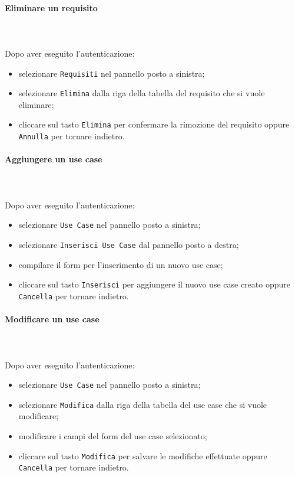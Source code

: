 	\paragraph{Eliminare un requisito} \mbox{}\\ \mbox{}\\
	Dopo aver eseguito l'autenticazione:
	\begin{itemize}
		\item selezionare \texttt{Requisiti} nel pannello posto a sinistra;
		\item selezionare \texttt{Elimina} dalla riga della tabella del requisito 
		che si vuole eliminare;\
		\item cliccare sul tasto \texttt{Elimina} per confermare la rimozione del requisito
		oppure \texttt{Annulla} per tornare indietro.
	\end{itemize}
	
	\paragraph{Aggiungere un use case} \mbox{}\\ \mbox{}\\
	Dopo aver eseguito l'autenticazione:
	\begin{itemize}
		\item selezionare \texttt{Use Case} nel pannello posto a sinistra;
		\item selezionare \texttt{Inserisci Use Case} dal pannello posto a destra;
		\item compilare il form per l'inserimento di un nuovo use case;
		\item cliccare sul tasto \texttt{Inserisci} per aggiungere il nuovo use case
		creato oppure \texttt{Cancella} per tornare indietro.	
	\end{itemize}
	
	\paragraph{Modificare un use case} \mbox{}\\ \mbox{}\\
	Dopo aver eseguito l'autenticazione:
	\begin{itemize}
		\item selezionare \texttt{Use Case} nel pannello posto a sinistra;
		\item selezionare \texttt{Modifica} dalla riga della tabella del use case
		che si vuole modificare;
		\item modificare i campi del form del use case selezionato;
		\item cliccare sul tasto \texttt{Modifica} per salvare le modifiche effettuate
		oppure \texttt{Cancella} per tornare indietro.
	\end{itemize}
	
